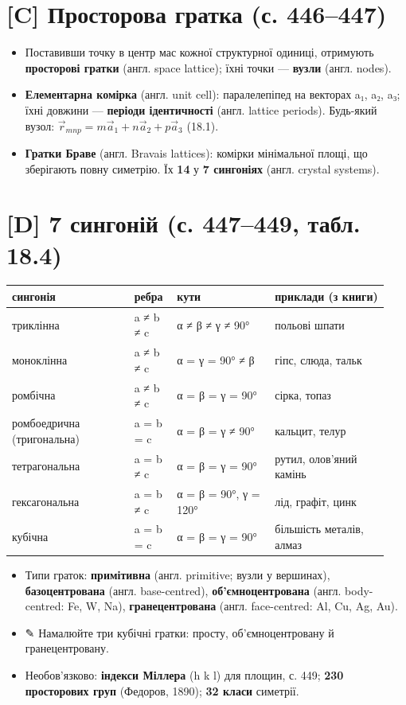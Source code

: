 \documentclass[11pt,a4paper,oneside]{book}
\newcommand{\pen}{{\sffamily\color{accent}✎}}
\begin{document}
\section*{[C] Просторова гратка (с. 446–447)}
\begin{itemize}
\item Поставивши точку в центр мас кожної структурної одиниці, отримують \textbf{просторові гратки} (англ. space lattice); їхні точки — \textbf{вузли} (англ. nodes).
\item \textbf{Елементарна комірка} (англ. unit cell): паралелепіпед на векторах a₁, a₂, a₃; їхні довжини — \textbf{періоди ідентичності} (англ. lattice periods). Будь-який вузол: $\vec r_{mnp} = m\vec a_1 + n\vec a_2 + p\vec a_3$ (18.1).
\item \textbf{Гратки Браве} (англ. Bravais lattices): комірки мінімальної площі, що зберігають повну симетрію. Їх \textbf{14} у \textbf{7 сингоніях} (англ. crystal systems).
\end{itemize}

\section*{[D] 7 сингоній (с. 447–449, табл. 18.4)}
{\small
\begin{longtable}{>{\raggedright\arraybackslash}p{0.304\linewidth}>{\raggedright\arraybackslash}p{0.105\linewidth}>{\raggedright\arraybackslash}p{0.246\linewidth}>{\raggedright\arraybackslash}p{0.281\linewidth}}
\toprule
\textbf{сингонія} & \textbf{ребра} & \textbf{кути} & \textbf{приклади (з книги)} \\
\midrule
\endhead
триклінна & a ≠ b ≠ c & α ≠ β ≠ γ ≠ 90° & польові шпати \\
моноклінна & a ≠ b ≠ c & α = γ = 90° ≠ β & гіпс, слюда, тальк \\
ромбічна & a ≠ b ≠ c & α = β = γ = 90° & сірка, топаз \\
ромбоедрична (тригональна) & a = b = c & α = β = γ ≠ 90° & кальцит, телур \\
тетрагональна & a = b ≠ c & α = β = γ = 90° & рутил, олов'яний камінь \\
гексагональна & a = b ≠ c & α = β = 90°, γ = 120° & лід, графіт, цинк \\
кубічна & a = b = c & α = β = γ = 90° & більшість металів, алмаз \\
\bottomrule
\end{longtable}
}
\begin{itemize}
\item Типи граток: \textbf{примітивна} (англ. primitive; вузли у вершинах), \textbf{базоцентрована} (англ. base-centred), \textbf{об'ємноцентрована} (англ. body-centred: Fe, W, Na), \textbf{гранецентрована} (англ. face-centred: Al, Cu, Ag, Au).
\item \pen{} Намалюйте три кубічні гратки: просту, об'ємноцентровану й гранецентровану.
\item Необов'язково: \textbf{індекси Міллера} (h k l) для площин, с. 449; \textbf{230 просторових груп} (Федоров, 1890); \textbf{32 класи} симетрії.
\end{itemize}
\end{document}
